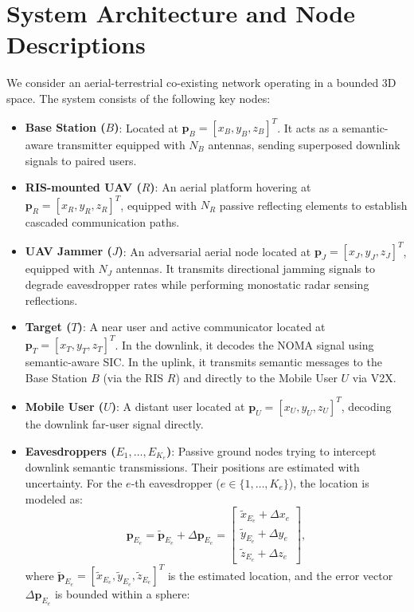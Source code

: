 \documentclass[journal,onecolumn]{IEEEtran}
\begin{document}
\section{System Architecture and Node Descriptions}
We consider an aerial-terrestrial co-existing network operating in a bounded 3D space. The system consists of the following key nodes:
\begin{itemize}
    \item \textbf{Base Station ($B$)}: Located at $\mathbf{p}_B = [x_B, y_B, z_B]^T$. It acts as a semantic-aware transmitter equipped with $N_B$ antennas, sending superposed downlink signals to paired users.
    \item \textbf{RIS-mounted UAV ($R$)}: An aerial platform hovering at $\mathbf{p}_R = [x_R, y_R, z_R]^T$, equipped with $N_R$ passive reflecting elements to establish cascaded communication paths.
    \item \textbf{UAV Jammer ($J$)}: An adversarial aerial node located at $\mathbf{p}_J = [x_J, y_J, z_J]^T$, equipped with $N_J$ antennas. It transmits directional jamming signals to degrade eavesdropper rates while performing monostatic radar sensing reflections.
    \item \textbf{Target ($T$)}: A near user and active communicator located at $\mathbf{p}_T = [x_T, y_T, z_T]^T$. In the downlink, it decodes the NOMA signal using semantic-aware SIC. In the uplink, it transmits semantic messages to the Base Station $B$ (via the RIS $R$) and directly to the Mobile User $U$ via V2X.
    \item \textbf{Mobile User ($U$)}: A distant user located at $\mathbf{p}_U = [x_U, y_U, z_U]^T$, decoding the downlink far-user signal directly.
    \item \textbf{Eavesdroppers ($E_1, \dots, E_{K_e}$)}: Passive ground nodes trying to intercept downlink semantic transmissions. Their positions are estimated with uncertainty. For the $e$-th eavesdropper ($e \in \{1, \dots, K_e\}$), the location is modeled as:
    \begin{equation}
        \mathbf{p}_{E_e} = \widetilde{\mathbf{p}}_{E_e} + \Delta\mathbf{p}_{E_e} = \begin{bmatrix} \tilde{x}_{E_e} + \Delta x_e \\ \tilde{y}_{E_e} + \Delta y_e \\ \tilde{z}_{E_e} + \Delta z_e \end{bmatrix},
    \end{equation}
    where $\widetilde{\mathbf{p}}_{E_e} = [\tilde{x}_{E_e}, \tilde{y}_{E_e}, \tilde{z}_{E_e}]^T$ is the estimated location, and the error vector $\Delta\mathbf{p}_{E_e}$ is bounded within a sphere:

\end{itemize}
\end{document}
